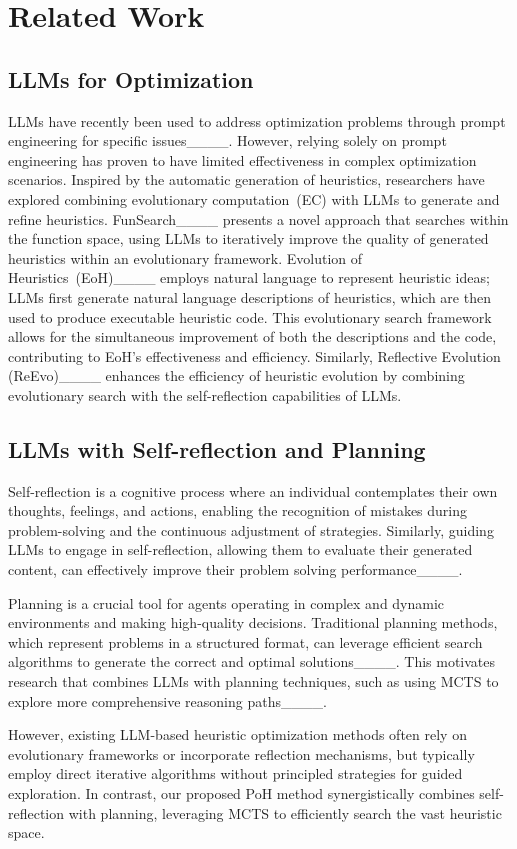 \section{Related Work}
\subsection{LLMs for Optimization}

LLMs have recently been used to address optimization problems through prompt engineering for specific issues____. However, relying solely on prompt engineering has proven to have limited effectiveness in complex optimization scenarios. Inspired by the automatic generation of heuristics, researchers have explored combining evolutionary computation~(EC) with LLMs to generate and refine heuristics. FunSearch____ presents a novel approach that searches within the function space, using LLMs to iteratively improve the quality of generated heuristics within an evolutionary framework. Evolution of Heuristics~(EoH)____ employs natural language to represent heuristic ideas; LLMs first generate natural language descriptions of heuristics, which are then used to produce executable heuristic code. This evolutionary search framework allows for the simultaneous improvement of both the descriptions and the code, contributing to EoH's effectiveness and efficiency. Similarly, Reflective Evolution (ReEvo)____ enhances the efficiency of heuristic evolution by combining evolutionary search with the self-reflection capabilities of LLMs.
\subsection{LLMs with Self-reflection and Planning}

Self-reflection is a cognitive process where an individual contemplates their own thoughts, feelings, and actions, enabling the recognition of mistakes during problem-solving and the continuous adjustment of strategies. Similarly, guiding LLMs to engage in self-reflection, allowing them to evaluate their generated content, can effectively improve their problem solving performance____.

Planning is a crucial tool for agents operating in complex and dynamic environments and making high-quality decisions. Traditional planning methods, which represent problems in a structured format, can leverage efficient search algorithms to generate the correct and optimal solutions____. This motivates research that combines LLMs with planning techniques, such as using MCTS to explore more comprehensive reasoning paths____.

However, existing LLM-based heuristic optimization methods often rely on evolutionary frameworks or incorporate reflection mechanisms, but typically employ direct iterative algorithms without principled strategies for guided exploration.  In contrast, our proposed PoH method synergistically combines self-reflection with planning, leveraging MCTS to efficiently search the vast heuristic space.
